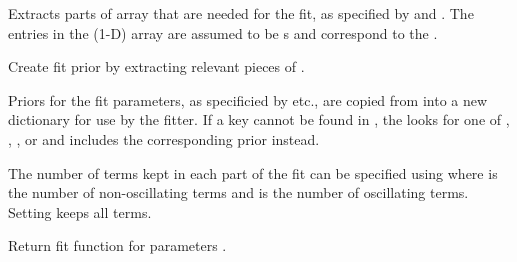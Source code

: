 \documentclass[letterpaper,10pt,english]{sphinxmanual}
\begin{document}
\begin{fulllineitems}
\begin{fulllineitems}
Extracts parts of array  that are needed for
the fit, as specified by  and . The entries
in the (1-D) array  are assumed to be
s and correspond to the .

\end{fulllineitems}


\begin{fulllineitems}
\label{corrfitter:corrfitter.Corr2.buildprior}
Create fit prior by extracting relevant pieces of .

Priors for the fit parameters, as specificied by  etc., 
are copied from  into a new dictionary for use by the
fitter. If a key  cannot be found in , the
 looks for one of , , 
, or  and includes the corresponding
prior instead.

The number of terms kept in each part of the fit can be 
specified using  where  is the 
number of non-oscillating terms and  is the number 
of oscillating terms. Setting  keeps 
all terms.

\end{fulllineitems}


\begin{fulllineitems}
\label{corrfitter:corrfitter.Corr2.fitfcn}
Return fit function for parameters .

\end{fulllineitems}


\end{fulllineitems}

\end{document}
